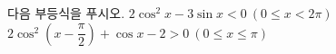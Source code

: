 다음 부등식을 푸시오.
 $2\cos^2 x-3\sin x<0\ (0\le x<2\pi)$
 $2\cos^2\left(x-\dfrac{\pi}{2}\right)+\cos x-2>0\ (0\le x\le\pi)$
